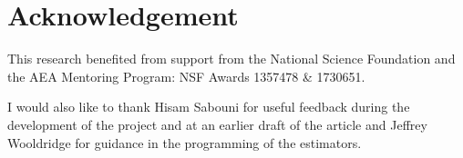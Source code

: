 \documentclass{juliacon}
\begin{document}
\section{Acknowledgement}

This research benefited from support from the National Science Foundation and the AEA Mentoring Program: NSF Awards 1357478 \& 1730651.

I would also like to thank Hisam Sabouni for useful feedback during the development of the project and at an earlier draft of the article \cite{JBSC2019} and Jeffrey Wooldridge for guidance in the programming of the estimators.



\appendix
\onecolumn





\end{document}
